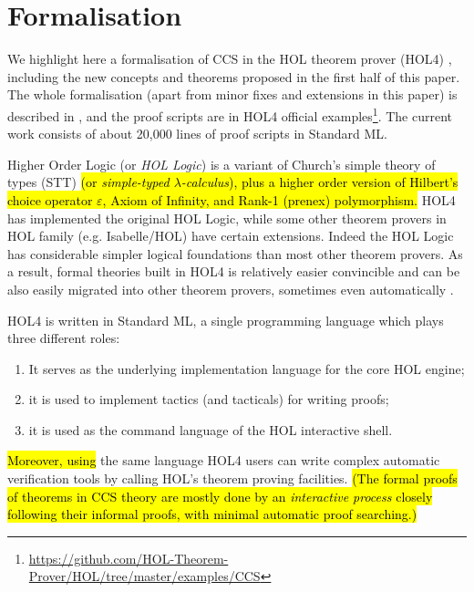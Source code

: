 \section{Formalisation}
\label{s:for}
We highlight here a formalisation of CCS
in the HOL theorem
prover (HOL4) \cite{slind2008brief},
including the new concepts and theorems proposed in the first half of
this paper.
The whole formalisation (apart from minor fixes and extensions in this
paper)
is described in \cite{Tian:2017wrba}, and the
proof scripts are in HOL4 official
examples\footnote{\url{https://github.com/HOL-Theorem-Prover/HOL/tree/master/examples/CCS}}. The
current work consists of about 20,000 lines of proof scripts in Standard ML.

Higher Order Logic (or \emph{HOL Logic}) \cite{hollogic} is a variant of
Church’s simple theory of types (STT) \cite{church1940formulation}
\hl{(or \emph{simple-typed $\lambda$-calculus}),
plus a higher order version of Hilbert's choice operator $\varepsilon$,
Axiom of Infinity, and Rank-1 (prenex) polymorphism.}
HOL4 has implemented the original HOL Logic, 
while some other theorem provers in HOL family (e.g. Isabelle/HOL) have
certain extensions.
Indeed the HOL Logic has considerable simpler logical
foundations than most other theorem provers. %
As a result,
formal theories built in HOL4 is relatively easier convincible and can
be also easily migrated into other theorem provers,
sometimes even automatically \cite{hurd2011opentheory}.

HOL4 is written in Standard ML, a single programming language which
plays three different roles:
\begin{enumerate}
\item It serves as the underlying implementation language for the core HOL engine;
\item it is used to implement tactics (and tacticals) for writing proofs;
\item it is used as the command language of the HOL interactive shell.
\end{enumerate}
\hl{Moreover, using} the same language HOL4 users can write complex automatic
verification tools by calling HOL's theorem proving
facilities. \hl{(The formal proofs of theorems in CCS theory
are mostly done by an \emph{interactive process} closely following
their informal proofs, with minimal automatic proof searching.)}

